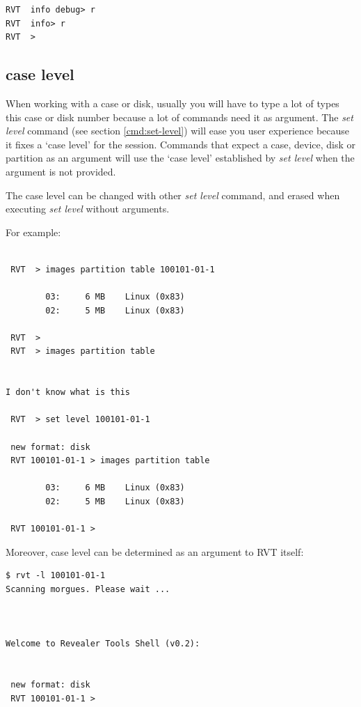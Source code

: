 \documentclass[a4paper,11pt,oneside]{report}
\begin{document}
\begin{verbatim}
RVT  info debug> r
RVT  info> r
RVT  > 
\end{verbatim}


\subsection{case level}

When working with a case or disk, usually you will have to type a lot of types this case or disk number because a lot of commands need it as argument. The \emph{set level} command (see section \ref{cmd:set-level}) will ease you user experience because it fixes a `case level' for the session. Commands that expect a case, device, disk or partition as an argument will use the `case level' established by \emph{set level} when the argument is not provided. 

The case level can be changed with other \emph{set level} command, and erased when executing \emph{set level} without arguments.

For example:

\begin{verbatim}

 RVT  > images partition table 100101-01-1                                    

        03:     6 MB    Linux (0x83)
        02:     5 MB    Linux (0x83)

 RVT  > 
 RVT  > images partition table


I don't know what is this

 RVT  > set level 100101-01-1                                                 

 new format: disk
 RVT 100101-01-1 > images partition table                                     

        03:     6 MB    Linux (0x83)
        02:     5 MB    Linux (0x83)

 RVT 100101-01-1 > 
\end{verbatim}


Moreover, case level can be determined as an argument to RVT itself:

\begin{verbatim}
$ rvt -l 100101-01-1
Scanning morgues. Please wait ...



Welcome to Revealer Tools Shell (v0.2):


 new format: disk
 RVT 100101-01-1 >  
\end{verbatim}
\end{document}
